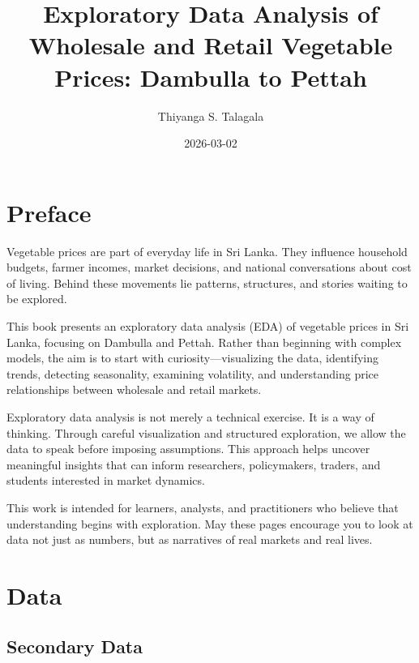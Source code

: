 \documentclass[
  letterpaper,
  DIV=11,
  numbers=noendperiod]{scrreprt}
\title{Exploratory Data Analysis of Wholesale and Retail Vegetable
Prices: Dambulla to Pettah}
\author{Thiyanga S. Talagala}
\date{2026-03-02}
\renewcommand*\contentsname{Table of contents}
\newcommand\contentsname{Table of contents}
\begin{document}
\maketitle

\renewcommand*\contentsname{Table of contents}
{
\hypersetup{linkcolor=}
\setcounter{tocdepth}{2}
\tableofcontents
}


\chapter*{Preface}\label{preface}


Vegetable prices are part of everyday life in Sri Lanka. They influence
household budgets, farmer incomes, market decisions, and national
conversations about cost of living. Behind these movements lie patterns,
structures, and stories waiting to be explored.

This book presents an exploratory data analysis (EDA) of vegetable
prices in Sri Lanka, focusing on Dambulla and Pettah. Rather than
beginning with complex models, the aim is to start with
curiosity---visualizing the data, identifying trends, detecting
seasonality, examining volatility, and understanding price relationships
between wholesale and retail markets.

Exploratory data analysis is not merely a technical exercise. It is a
way of thinking. Through careful visualization and structured
exploration, we allow the data to speak before imposing assumptions.
This approach helps uncover meaningful insights that can inform
researchers, policymakers, traders, and students interested in market
dynamics.

This work is intended for learners, analysts, and practitioners who
believe that understanding begins with exploration. May these pages
encourage you to look at data not just as numbers, but as narratives of
real markets and real lives.


\chapter{Data}\label{data}

\section{Secondary Data}\label{secondary-data}
\end{document}
